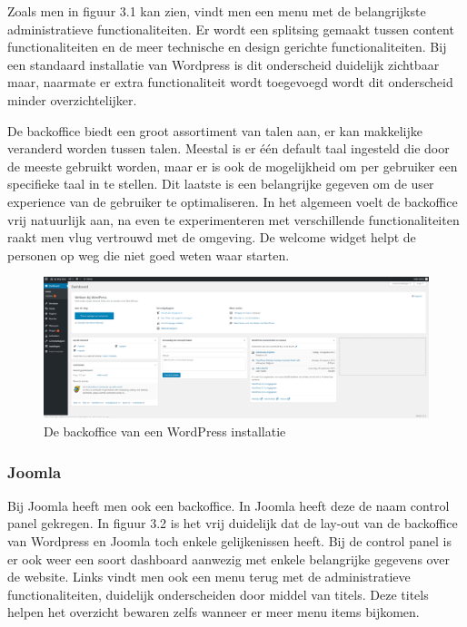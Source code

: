 Zoals men in figuur 3.1 kan zien, vindt men een menu met de belangrijkste administratieve functionaliteiten. Er wordt een splitsing gemaakt tussen content functionaliteiten en de meer technische en design gerichte functionaliteiten. Bij een standaard installatie van Wordpress is dit onderscheid duidelijk zichtbaar maar, naarmate er extra functionaliteit wordt toegevoegd wordt dit onderscheid minder overzichtelijker. 

De backoffice biedt een groot assortiment van talen aan, er kan makkelijke veranderd worden tussen talen. Meestal is er één default taal ingesteld die door de meeste gebruikt worden, maar er is ook de mogelijkheid om per gebruiker een specifieke taal in te stellen. Dit laatste is een belangrijke gegeven om de user experience van de gebruiker te optimaliseren. In het algemeen voelt de backoffice vrij natuurlijk aan, na even te experimenteren met verschillende functionaliteiten raakt men vlug vertrouwd met de omgeving. De welcome widget helpt de personen op weg die niet goed weten waar starten. 
\begin{figure}
    \centering
    \includegraphics[scale = 0.2]{img/Backoffice_WordPpress.png}
    \caption{De backoffice van een WordPress installatie}
    \label{fig:backofficeWP}
\end{figure}
\subsubsection{Joomla}
Bij Joomla heeft men ook een backoffice. In Joomla heeft deze de naam control panel gekregen. In figuur 3.2 is het vrij duidelijk dat de lay-out van de backoffice van Wordpress en Joomla  toch enkele gelijkenissen heeft. Bij de control panel is er ook weer een soort dashboard aanwezig met enkele belangrijke gegevens over de website. Links vindt men ook een menu terug met de administratieve functionaliteiten, duidelijk onderscheiden door middel van titels. Deze titels helpen het overzicht bewaren zelfs wanneer er meer menu items bijkomen.


